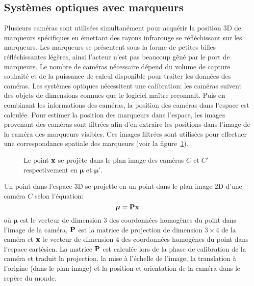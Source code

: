 \subsection{Systèmes optiques avec marqueurs}
Plusieurs caméras sont utilisées simultanément pour acquérir la
position 3D de marqueurs spécifiques en émettant des rayons infrarouge se réfléchissant
sur les marqueurs. Les marqueurs se présentent
sous la forme de petites billes réfléchissantes légères, ainsi l'acteur n'est pas beaucoup gêné
par le port de marqueurs.
Le nombre de caméras nécessaire dépend du volume de capture souhaité et
de la puissance de calcul disponible pour traiter les données des caméras.
Les systèmes optiques nécessitent une calibration: les caméras suivent
des objets de dimensions connues que le logiciel maître reconnait.
Puis en combinant les informations des caméras, la position des caméras dans l'espace 
est calculée. 
Pour estimer la position des marqueurs dans l'espace, 
les images provenant des caméras sont filtrées afin d'en extraire
les positions dans l'image de la caméra des marqueurs visibles.
Ces images filtrées sont utilisées pour effectuer une correspondance spatiale des marqueurs
(voir la figure~\ref{fig:triang}).
\begin{figure}[t]
  \begin{center}
    \resizebox{0.5\textwidth}{!}{
    
    }
  \end{center}
  \caption{Le point ${\mathbf{x}}$ se projète dans le plan image des caméras $C$ et $C'$ respectivement en
  $\boldsymbol{\mu}$ et $\boldsymbol{\mu}'$.}
  \label{fig:triang}
\end{figure}
Un point dans l'espace 3D se projette en un point
dans le plan image 2D d'une caméra $C$ selon l'équation:
\begin{equation}
  \boldsymbol{\mu} = \mbf{P} \mbf{x}
  \label{eq:projCamera}
\end{equation}
\noindent où $\boldsymbol{\mu}$ est le vecteur de dimension $3$ des coordonnées homogènes
du point dans l'image de la caméra, ${\mathbf{P}}$ est la matrice de projection de dimension $3\times4$
de la caméra et ${\mathbf{x}}$ le vecteur de dimension $4$ des coordonnées homogènes du point dans l'espace
cartésien. La matrice ${\mathbf{P}}$ est calculée lors de la phase de calibration de la caméra
et traduit la projection, la mise à l'échelle de l'image, la translation à l'origine (dans le plan image)
et la position et orientation de la caméra dans le repère du monde.

